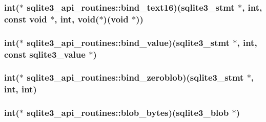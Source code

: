 \hypertarget{structsqlite3__api__routines_a4613c5fa0a1fac009914ddd0f4415cfd}{
\subsubsection[{bind\-\_\-text16}]{\setlength{\rightskip}{0pt plus 5cm}int($\ast$ sqlite3\-\_\-api\-\_\-routines\-::bind\-\_\-text16)({\bf sqlite3\-\_\-stmt} $\ast$, int, const void $\ast$, int, void($\ast$)(void $\ast$))}}\label{structsqlite3__api__routines_a4613c5fa0a1fac009914ddd0f4415cfd}
\hypertarget{structsqlite3__api__routines_aca47715615cc037cd2f850e8c87cd68d}{
\subsubsection[{bind\-\_\-value}]{\setlength{\rightskip}{0pt plus 5cm}int($\ast$ sqlite3\-\_\-api\-\_\-routines\-::bind\-\_\-value)({\bf sqlite3\-\_\-stmt} $\ast$, int, const {\bf sqlite3\-\_\-value} $\ast$)}}\label{structsqlite3__api__routines_aca47715615cc037cd2f850e8c87cd68d}
\hypertarget{structsqlite3__api__routines_a1a1257f2722e96c06e8db5aa22aebddb}{
\subsubsection[{bind\-\_\-zeroblob}]{\setlength{\rightskip}{0pt plus 5cm}int($\ast$ sqlite3\-\_\-api\-\_\-routines\-::bind\-\_\-zeroblob)({\bf sqlite3\-\_\-stmt} $\ast$, int, int)}}\label{structsqlite3__api__routines_a1a1257f2722e96c06e8db5aa22aebddb}
\hypertarget{structsqlite3__api__routines_a435b470368220faf25063c1a673952ea}{
\subsubsection[{blob\-\_\-bytes}]{\setlength{\rightskip}{0pt plus 5cm}int($\ast$ sqlite3\-\_\-api\-\_\-routines\-::blob\-\_\-bytes)({\bf sqlite3\-\_\-blob} $\ast$)}}\label{structsqlite3__api__routines_a435b470368220faf25063c1a673952ea}
